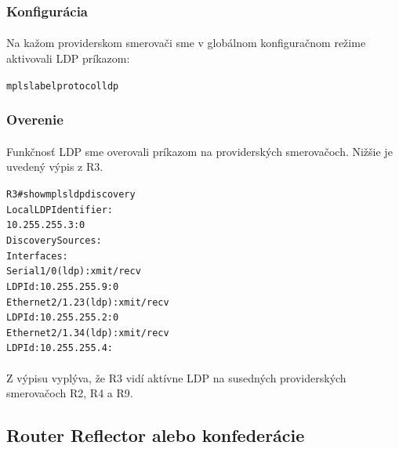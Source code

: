 \documentclass[12pt,twoside,a4paper]{report}
\begin{document}
\subsubsection{Konfigurácia}
\paragraph{}
Na kažom providerskom smerovači sme v globálnom konfiguračnom režime aktivovali LDP príkazom:

\noindent
{\selectfont
\begin{small}
\begin{alltt}
mpls label protocol ldp
\end{alltt}
\end{small}
}

\subsubsection{Overenie}
\paragraph{}
Funkčnosť LDP sme overovali príkazom  na providerských smerovačoch. Nižšie je uvedený výpis z R3.

\noindent
{\selectfont
\begin{small}
\begin{alltt}
R3#show mpls ldp discovery
 Local LDP Identifier:
    10.255.255.3:0
    Discovery Sources:
    Interfaces:
	Serial1/0 (ldp): xmit/recv
	    LDP Id: 10.255.255.9:0
	Ethernet2/1.23 (ldp): xmit/recv
	    LDP Id: 10.255.255.2:0
	Ethernet2/1.34 (ldp): xmit/recv
	    LDP Id: 10.255.255.4:
\end{alltt}
\end{small}
}

\paragraph{}
Z výpisu vyplýva, že R3 vidí aktívne LDP na susedných providerských smerovačoch R2, R4 a R9.














\subsection{Router Reflector alebo konfederácie}
\end{document}
